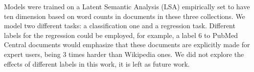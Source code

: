 Models were trained on a Latent Semantic Analysis (LSA) empirically set to have ten dimension based on word counts in documents in these three collections.
We model two different tasks: a classification one and a regression task.
Different labels for the regression could be employed, for example, a label 6 to PubMed Central documents would emphasize that these documents are explicitly made for expert users, being 3 times harder than Wikipedia ones. We did not explore the effects of different labels in this work, it is left as future work.




